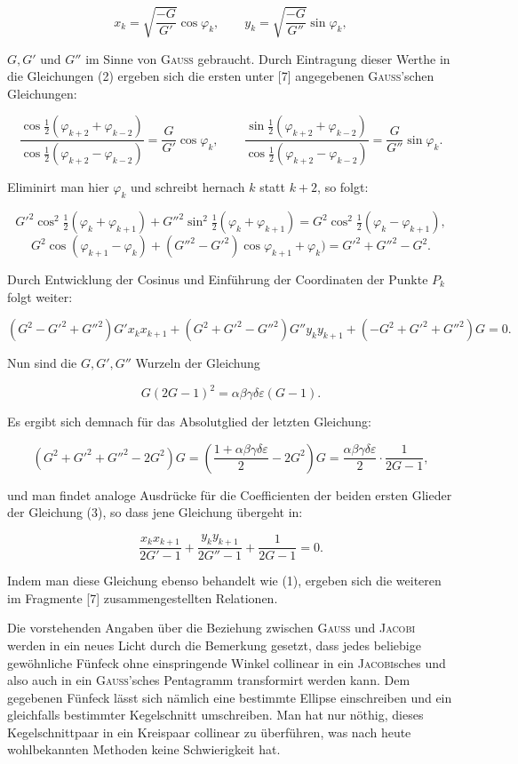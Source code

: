 \[
x_k = \sqrt{\dfrac{-G}{G'}}\cos\varphi_k, \qquad y_k = \sqrt{\dfrac{-G}{G''}}\sin\varphi_k,
\]

$G, G'$ und $G''$ im Sinne von \textsc{Gauss} gebraucht. Durch Eintragung dieser Werthe in die
Gleichungen (2) ergeben sich die ersten unter [7] angegebenen \textsc{Gauss}'schen Gleichungen:

\[
\dfrac{\cos\frac{1}{2}(\varphi_{k+2}+\varphi_{k-2})}{\cos\frac{1}{2}(\varphi_{k+2}-\varphi_{k-2})}
= \dfrac{G}{G'}\cos\varphi_k, \qquad
\dfrac{\sin\frac{1}{2}(\varphi_{k+2}+\varphi_{k-2})}{\cos\frac{1}{2}(\varphi_{k+2}-\varphi_{k-2})}
= \dfrac{G}{G''}\sin\varphi_k.
\]

Eliminirt man hier $\varphi_k$ und schreibt hernach $k$ statt $k+2$, so folgt:

\[
G'^2\cos^2\tfrac{1}{2}(\varphi_k+\varphi_{k+1}) + G''^2\sin^2\tfrac{1}{2}(\varphi_k+\varphi_{k+1})
= G^2\cos^2\tfrac{1}{2}(\varphi_k-\varphi_{k+1}),
\]
\[
G^2\cos(\varphi_{k+1}-\varphi_k) + (G''^2-G'^2)\cos\varphi_{k+1}+\varphi_k) = G'^2+G''^2-G^2.
\]

Durch Entwicklung der Cosinus und Einführung der Coordinaten der Punkte $P_k$ folgt weiter:

\[
(G^2-G'^2+G''^2)G'x_kx_{k+1} + (G^2+G'^2-G''^2)G''y_ky_{k+1} +
(-G^2+G'^2+G''^2)G = 0.\tag{3}
\]

Nun sind die $G, G', G''$ Wurzeln der Gleichung

\[
G(2G-1)^2 = \alpha\beta\gamma\delta\varepsilon(G-1).
\]

Es ergibt sich demnach für das Absolutglied der letzten Gleichung:

\[
(G^2+G'^2+G''^2-2G^2)G = \left(\dfrac{1+\alpha\beta\gamma\delta\varepsilon}{2} - 2G^2\right)G
= \dfrac{\alpha\beta\gamma\delta\varepsilon}{2}\cdot\dfrac{1}{2G-1},
\]

und man findet analoge Ausdrücke für die Coefficienten der beiden ersten Glieder der
Gleichung (3), so dass jene Gleichung übergeht in:

\[
\dfrac{x_kx_{k+1}}{2G'-1} + \dfrac{y_ky_{k+1}}{2G''-1} + \dfrac{1}{2G-1} = 0.\tag{4}
\]

Indem man diese Gleichung ebenso behandelt wie (1), ergeben sich die weiteren im Fragmente
[7] zusammengestellten Relationen.

Die vorstehenden Angaben über die Beziehung zwischen \textsc{Gauss} und \textsc{Jacobi} werden in ein neues
Licht durch die Bemerkung gesetzt, dass jedes beliebige gewöhnliche Fünfeck ohne
einspringende Winkel collinear in ein \textsc{Jacobi}sches und also auch in ein \textsc{Gauss}'sches
Pentagramm transformirt werden kann. Dem gegebenen Fünfeck lässt sich nämlich eine
bestimmte Ellipse einschreiben und ein gleichfalls bestimmter Kegelschnitt umschreiben. Man
hat nur nöthig, dieses Kegelschnittpaar in ein Kreispaar collinear zu überführen, was nach
heute wohlbekannten Methoden keine Schwierigkeit hat.

